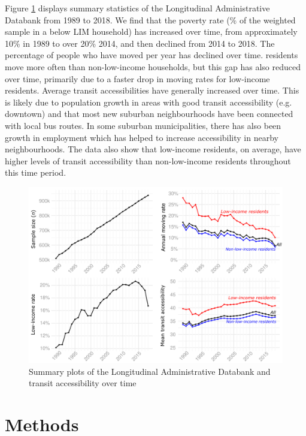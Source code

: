 Figure \ref{fig:4plots} displays summary statistics of the Longitudinal Administrative Databank from 1989 to 2018. We find that the poverty rate (\% of the weighted sample in a below LIM household) has increased over time, from approximately 10\% in 1989 to over 20\% 2014, and then declined from 2014 to 2018. The percentage of people who have moved per year has declined over time.  residents move more often than non-low-income households, but this gap has also reduced over time, primarily due to a faster drop in moving rates for low-income residents. Average transit accessibilities have generally increased over time. This is likely due to population growth in areas with good transit accessibility (e.g. downtown) and that most new suburban neighbourhoods have been connected with local bus routes. In some suburban municipalities, there has also been growth in employment which has helped to increase accessibility in nearby neighbourhoods. The data also show that low-income residents, on average, have higher levels of transit accessibility than non-low-income residents throughout this time period.


\begin{figure}[H]
	\centering
	\includegraphics[width=1\linewidth]{figures/4plots.png}
	\caption{{Summary plots of the Longitudinal Administrative Databank and transit accessibility over time}}
	\label{fig:4plots}
\end{figure}




\section{Methods}


